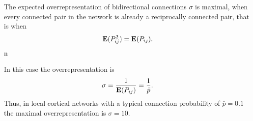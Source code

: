 
The expected overrepresentation of bidirectional connections $\sigma$ is maximal, when every connected pair in the network is already a reciprocally connected pair, that is when
\[
\operatorname{\mathbf{E}}(P_{ij}^2) = \operatorname{\mathbf{E}}(P_{ij}).
\]
n

In this case the overrepresentation is
\[
\sigma = \frac{1}{\operatorname{\mathbf{E}}(P_{ij})} = \frac{1}{\bar{p}}.
\]
Thus, in local cortical networks with a typical connection probability of $\bar{p} = 0.1$ the maximal overrepresentation is $\sigma = 10$.
